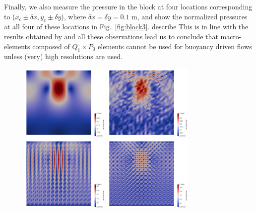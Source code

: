 \documentclass[a4paper,12pt]{article}
\begin{document}
Finally, we also measure the pressure in the block 
at four locations corresponding to ($x_c \pm \delta x, y_c \pm \delta y$),
where $\delta x = \delta y = 0.1$ m, and show the normalized pressures
at all four of these locations in Fig.~\ref{fig:block3}.
{\color{red} describe}
This is in line with the results obtained by \cite{thba22} and 
all these observations lead us to conclude that 
macro-elements composed of $Q_1 \times P_0$ elements cannot be used for buoyancy 
driven flows unless (very) high resolutions are used.

\begin{figure}[t]
\centering
\includegraphics[width=4.3cm]{../results/exp08/fig16x16_full/vel0.jpg} %
\includegraphics[width=4.3cm]{../results/exp08/fig16x16_full/vel9.jpg} %
\includegraphics[width=4.3cm]{../results/exp08/fig16x16_full/vel1.jpg} %
\includegraphics[width=4.3cm]{../results/exp08/fig16x16_full/vel2.jpg}\\ %

\end{figure}
\end{document}
